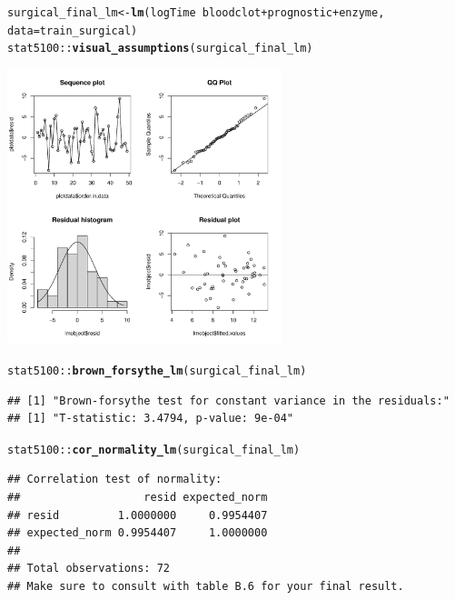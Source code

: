 \documentclass{article}\usepackage[]{graphicx}\usepackage[]{color}
\makeatletter
\newcommand{\hlopt}[1]{\textcolor[rgb]{0,0,0}{#1}}%
\newcommand{\hlstd}[1]{\textcolor[rgb]{0.345,0.345,0.345}{#1}}%
\newcommand{\hlkwb}[1]{\textcolor[rgb]{0.69,0.353,0.396}{#1}}%
\newcommand{\hlkwc}[1]{\textcolor[rgb]{0.333,0.667,0.333}{#1}}%
\newcommand{\hlkwd}[1]{\textcolor[rgb]{0.737,0.353,0.396}{\textbf{#1}}}%
\newenvironment{kframe}{%
 \def\at@end@of@kframe{}%
 \ifinner\ifhmode%
  \def\at@end@of@kframe{\end{minipage}}%
  \begin{minipage}{\columnwidth}%
 \fi\fi%
 \def\FrameCommand##1{\hskip\@totalleftmargin \hskip-\fboxsep
 \colorbox{shadecolor}{##1}\hskip-\fboxsep
     \hskip-\linewidth \hskip-\@totalleftmargin \hskip\columnwidth}%
 \MakeFramed {\advance\hsize-\width
   \@totalleftmargin\z@ \linewidth\hsize
   \@setminipage}}%
 {\par\unskip\endMakeFramed%
 \at@end@of@kframe}
\newenvironment{knitrout}{}{} %
\makeatother
\begin{document}
\begin{knitrout}
\color{fgcolor}\begin{kframe}
\begin{alltt}
\hlstd{surgical_final_lm} \hlkwb{<-} \hlkwd{lm}\hlstd{(logTime} \hlopt{~} \hlstd{bloodclot} \hlopt{+} \hlstd{prognostic} \hlopt{+} \hlstd{enzyme,}
                        \hlkwc{data} \hlstd{= train_surgical)}
\hlstd{stat5100}\hlopt{::}\hlkwd{visual_assumptions}\hlstd{(surgical_final_lm)}
\end{alltt}
\end{kframe}

{\centering \includegraphics[width=0.6\textwidth]{figure/unnamed-chunk-8-1} 

}


\begin{kframe}\begin{alltt}
\hlstd{stat5100}\hlopt{::}\hlkwd{brown_forsythe_lm}\hlstd{(surgical_final_lm)}
\end{alltt}
\begin{verbatim}
## [1] "Brown-forsythe test for constant variance in the residuals:"
## [1] "T-statistic: 3.4794, p-value: 9e-04"
\end{verbatim}
\begin{alltt}
\hlstd{stat5100}\hlopt{::}\hlkwd{cor_normality_lm}\hlstd{(surgical_final_lm)}
\end{alltt}
\begin{verbatim}
## Correlation test of normality:
##                   resid expected_norm
## resid         1.0000000     0.9954407
## expected_norm 0.9954407     1.0000000
## 
## Total observations: 72
## Make sure to consult with table B.6 for your final result.
\end{verbatim}
\end{kframe}
\end{knitrout}
\end{document}
